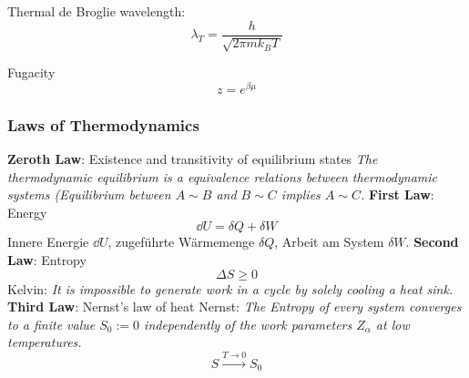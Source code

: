 			\noindent
			Thermal de Broglie wavelength:
			\begin{equation}
				\lambda_T = \frac{h}{\sqrt{2\pi m k_B T}}
			\end{equation} \vsp

			\noindent
			Fugacity
			\begin{equation}
				z = e^{\beta\mu}
			\end{equation} \vsp

		\subsubsection{Laws of Thermodynamics}
			\textbf{Zeroth Law}: Existence and transitivity of equilibrium states\newline
				\indent \emph{The thermodynamic equilibrium is a equivalence relations between thermodynamic systems (Equilibrium between $A \sim B$ and $B \sim C$ implies $A \sim C$.} \nl
			\textbf{First Law}: Energy
				\begin{equation}
					\label{Eq:FirstLawOfThermodynamics}
					\dd U = \delta Q + \delta W
				\end{equation}
				\indent Innere Energie $\dd U$, zugeführte Wärmemenge $\delta Q$, Arbeit am System $\delta W$. \nl
			\textbf{Second Law}: Entropy
				\begin{equation}
					\label{Eq:SecondLawOfThermodynamics}
					\Delta S	\ge 0
				\end{equation}
				\indent Kelvin: \emph{It is impossible to generate work in a cycle by solely cooling a heat sink.}\nl
			\textbf{Third Law}: Nernst's law of heat\newline
				\indent Nernst: \emph{The Entropy of every system converges to a finite value $S_0:=0$ independently of the work parameters $Z_\alpha$ at low temperatures.
				\begin{equation}
					S \stackrel{T \rightarrow 0}{\longrightarrow} S_0
					\label{Eq:ThirdLawOfThermodynamics}
				\end{equation}}

